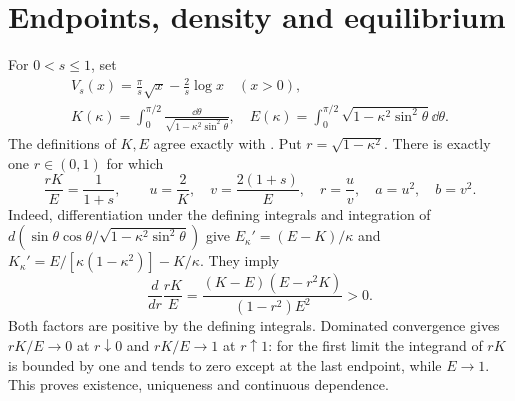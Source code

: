 \documentclass[11pt]{article}
\begin{document}
\section{Endpoints, density and equilibrium}
For $0<s\le1$, set
\begin{equation}\tag{GM1}
 \begin{gathered}
 V_s(x)=\frac\pi s\sqrt x-\frac2s\log x\quad(x>0),\qquad
 \\
 K(\kappa)=\int_0^{\pi/2}\frac{\dd\theta}{\sqrt{1-\kappa^2\sin^2\theta}},
 \quad E(\kappa)=\int_0^{\pi/2}\sqrt{1-\kappa^2\sin^2\theta}\dd\theta.
 \end{gathered}
\end{equation}
The definitions of $K,E$ agree exactly with \cite[19.2.4, 19.2.5,
19.2.8(a,b)]{Carlson}. Put $r=\sqrt{1-\kappa^2}$. There is exactly one
$r\in(0,1)$ for which
\begin{equation}\tag{GM2}
 \frac{rK}{E}=\frac1{1+s},\qquad
 u=\frac2K,\quad v=\frac{2(1+s)}E,\quad r=\frac uv,
 \quad a=u^2,\quad b=v^2.
\end{equation}
Indeed, differentiation under the defining integrals and integration of
$d(\sin\theta\cos\theta/\sqrt{1-\kappa^2\sin^2\theta})$ give
$E_\kappa'=(E-K)/\kappa$ and
$K_\kappa'=E/[\kappa(1-\kappa^2)]-K/\kappa$.
They imply
\begin{equation}\tag{GM3}
 \frac{d}{dr}\frac{rK}E
 =\frac{(K-E)(E-r^2K)}{(1-r^2)E^2}>0.
\end{equation}
Both factors are positive by the defining integrals. Dominated convergence
gives $rK/E\to0$ at $r\downarrow0$ and $rK/E\to1$ at $r\uparrow1$:
for the first limit the integrand of $rK$ is bounded by one and tends
to zero except at the last endpoint, while $E\to1$.
This proves existence, uniqueness and continuous dependence.
\end{document}
